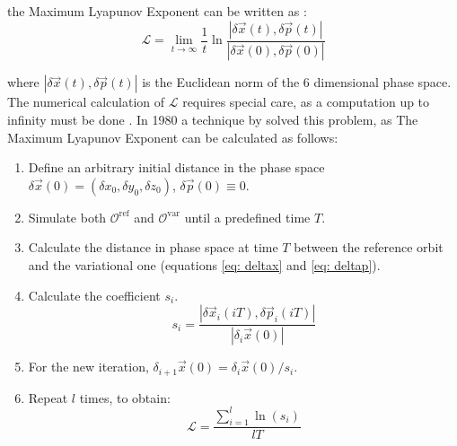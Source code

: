	the Maximum Lyapunov Exponent can be written as \cite{morbidelli2002modern, munoz2015chaotic}:
	\begin{equation}
		\mathcal{L} = \lim_{t\rightarrow\infty}\dfrac{1}{t}\ln\dfrac{\left|\delta\vec{x}(t), \delta\vec{p}(t)\right|}{\left|\delta\vec{x}(0), \delta\vec{p}(0)\right|}
	\end{equation}
	
	where $|\delta\vec{x}(t), \delta\vec{p}(t)|$ is the Euclidean norm of the 6 dimensional phase space. The numerical calculation of $\mathcal{L}$ requires special care, as a computation up to infinity must be done \cite{morbidelli2002modern}. In 1980 a technique by \citeauthor{benettin1980lyapunov} solved this problem, as The Maximum Lyapunov Exponent can be calculated as follows:
	\begin{enumerate}
		\item Define an arbitrary initial distance in the phase space $\delta\vec{x}(0) = (\delta x_0, \delta y_0, \delta z_0)$, $\delta\vec{p}(0) \equiv 0$.
		\item Simulate both $\mathcal{O}^\text{ref}$ and $\mathcal{O}^\text{var}$ until a predefined time $T$.
		\item Calculate the distance in phase space at time $T$ between the reference orbit and the variational one (equations \ref{eq: deltax} and \ref{eq: deltap}).
		\item Calculate the coefficient $s_i$.
		\begin{equation}
			s_i = \dfrac{\left|\delta\vec{x}_i(iT), \delta\vec{p}_i(iT)\right|}{\left|\delta_i\vec{x}(0)\right|}
		\end{equation}
		\item For the new iteration, $\delta_{i + 1}\vec{x}(0) = \delta_i\vec{x}(0) / s_i$.
		\item Repeat $l$ times, to obtain:
		\begin{equation}
			\mathcal{L} = \dfrac{\sum_{i = 1}^l \ln(s_i)}{lT}
		\end{equation}
	\end{enumerate} 
	